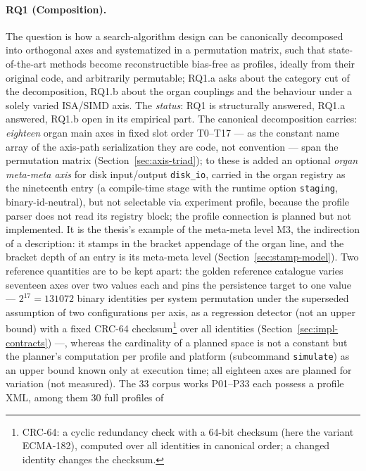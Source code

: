 \begin{nurlang}
\paragraph{RQ1 (Composition).} The question is how a search-algorithm design can be canonically
decomposed into orthogonal axes and systematized in a permutation matrix, such that
state-of-the-art methods become reconstructible bias-free as profiles, ideally from their original
code, and arbitrarily permutable; RQ1.a asks about the category cut of the decomposition, RQ1.b
about the organ couplings and the behaviour under a solely varied ISA/SIMD axis. The \emph{status}:
RQ1 is structurally answered, RQ1.a answered, RQ1.b open in its empirical part. The canonical
decomposition carries: \emph{eighteen} organ main axes in fixed slot order T0--T17 --- as the
constant name array of the axis-path serialization they are code, not convention --- span the
permutation matrix (Section~\ref{sec:axis-triad}); to these is added an optional
\emph{organ meta-meta axis} for disk input/output \texttt{disk\_io}, carried in the organ registry
as the nineteenth entry (a compile-time stage with the runtime option \texttt{staging},
binary-id-neutral), but not selectable via experiment profile, because the profile parser does not
read its registry block; the profile connection is planned but not implemented. It is the thesis's
example of the meta-meta level M3, the indirection of a description: it stamps in the bracket
appendage of the organ line, and the bracket depth of an entry is its meta-meta level
(Section~\ref{sec:stamp-model}). Two reference quantities are to be kept apart: the golden
reference catalogue varies seventeen axes over two values each and pins the persistence target to
one value --- $2^{17} = 131072$ binary identities per system permutation under the superseded assumption of
two configurations per axis, as a regression detector (not an upper bound)
with a fixed CRC-64 checksum\footnote{CRC-64: a cyclic redundancy check with a 64-bit checksum
(here the variant ECMA-182), computed over all identities in canonical order; a changed identity
changes the checksum.} over all identities (Section~\ref{sec:impl-contracts}) ---, whereas the
cardinality of a planned space is not a constant but the planner's computation per profile and
platform (subcommand \texttt{simulate}) as an upper bound known only at execution time; all eighteen axes are planned for variation (not
measured). The 33 corpus works P01--P33 each possess a profile XML, among them 30 full profiles of

\end{nurlang}
